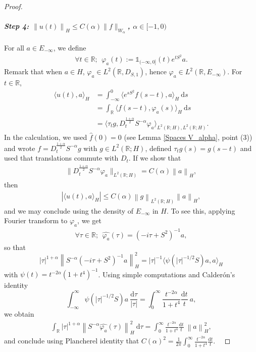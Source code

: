 \documentclass[10pt,a4paper]{amsart}
\begin{document}
\begin{proof}
\paragraph{\textit{Step 4:  $\left\| u(t)\right\|_H \le C(\alpha) \|f\|_{W_\alpha}$, $ \alpha\in [-1,0)$}}
For all $a\in E_{-\infty}$, we define 
\begin{align*}
  \forall t \in \mathbb{R};\ \   \varphi_a(t):= \mathbb{1}_{(-\infty,0]}(t) e^{tS^2}a.
\end{align*}
Remark that when $a\in H$, $\varphi_a\in L^2(\mathbb{R}, D_{S,1})$, hence $\varphi_a \in L^2(\mathbb{R}, E_{-\infty})$.
 For  $t \in \mathbb{R}$,
\begin{align*}
    \langle u(t), a \rangle_H 
    &=  \int_{-\infty}^{0} \langle e ^{sS^2}f(s-t) , a \rangle_H \  \mathrm d s
    \\ 
    &= \int_{\mathbb{R}} \langle f(s-t), \varphi_a (s) \rangle_H \ \mathrm d s 
    \\ 
    &
    = \langle \tau_t g, D_t^{\frac{1+\alpha}{2}}S^{-\alpha}\varphi_a \rangle_{L^2(\mathbb{R};H),L^2(\mathbb{R};H)}. 
\end{align*}
In the calculation, we used $\hat f(0)=0$ (see Lemma \ref{Spaces V_alpha}, point (3)) and wrote $f=D_t^{\frac{1+\alpha}{2}}S^{-\alpha}g$ with $g\in L^2(\mathbb{R}; H)$, defined $\tau_tg(s)=g(s-t)$ and  used that translations commute with $D_t$.  If we show  that 
\begin{align*}\label{Hinfini estimation}
     \| D_t^{\frac{1+\alpha}{2}} S^{-\alpha}\varphi_a  \|_{L^2(\mathbb{R}; H)} = C(\alpha) \left \| a \right \|_H,
\end{align*} then
\begin{align*}
    \left | \langle u(t), a \rangle_H \right |\leq C(\alpha) \left \| g \right \|_{L^2(\mathbb{R}; H)}\left \| a \right \|_H,
\end{align*}
and  we may conclude using the density of $E_{-\infty}$ in $H$. To see this, 
applying Fourier transform to $\varphi_a$, we get 
\begin{align*}
    \forall \tau \in \mathbb{R}; \ \ \hat{\varphi_a}(\tau)= (-i \tau+S^2)^{-1}a, 
\end{align*}
so that
\begin{equation*}
    \left | \tau  \right |^{1+\alpha} \left \| S^{-\alpha}(-{i} \tau+S^2 )^{-1}a \right \|^2_H= |\tau|^{-1} \langle \psi(|\tau|^{-1/2}S) a, a \rangle_H
\end{equation*}
with $\psi(t)= t^{-2\alpha}(1+t^4)^{-1}$.  Using simple computations and Calder\'on's identity $$\int_{-\infty}
^\infty \psi(|\tau|^{-1/2}S)a \ \frac{\mathrm{d}\tau}{|\tau|}=  \int_0^\infty \frac{ t ^{-2\alpha }}{1+t^4} \frac{\mathrm d t}{ t }\  a,$$ we obtain 
\begin{align*}
    \int_{\mathbb{R}} \left | \tau  \right |^{1+\alpha} \left \|S^{-\alpha} \hat{\varphi_a }(\tau) \right \|^2_{H} \ \mathrm{d} \tau =   \int_0^\infty \frac{ t ^{-2\alpha }}{1+t^4} \frac{\mathrm d t}{ t }\ \left \| a \right \|^2_H,
\end{align*}
and conclude using Plancherel identity that $C(\alpha)^2= \frac{1}{2\pi}\int_0^\infty \frac{ t ^{-2\alpha }}{1+t^4} \frac{\mathrm d t}{ t }$.
\


\end{proof}
\end{document}
